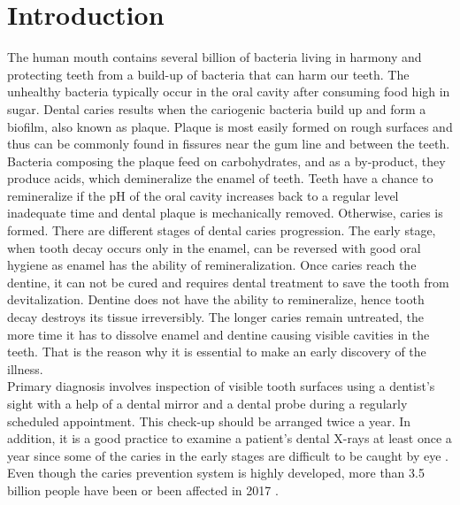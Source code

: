 \chapter{Introduction}
The human mouth contains several billion of bacteria living in harmony and protecting teeth from a build-up of bacteria that can harm our teeth. The unhealthy bacteria typically occur in the oral cavity after consuming food high in sugar. Dental caries results when the cariogenic bacteria build up and form a biofilm, also known as plaque. Plaque is most easily formed on rough surfaces and thus can be commonly found in fissures near the gum line and between the teeth. Bacteria composing the plaque feed on carbohydrates, and as a by-product, they produce acids, which demineralize the enamel of teeth. Teeth have a chance to remineralize if the pH of the oral cavity increases back to a regular level inadequate time and dental plaque is mechanically removed. Otherwise, caries is formed. There are different stages of dental caries progression. The early stage, when tooth decay occurs only in the enamel, can be reversed with good oral hygiene as enamel has the ability of remineralization. Once caries reach the dentine, it can not be cured and requires dental treatment to save the tooth from devitalization. Dentine does not have the ability to remineralize, hence tooth decay destroys its tissue irreversibly. The longer caries remain untreated, the more time it has to dissolve enamel and dentine causing visible cavities in the teeth. That is the reason why it is essential to make an early discovery of the illness. \\
Primary diagnosis involves inspection of visible tooth surfaces using a dentist's sight with a help of a dental mirror and a dental probe during a regularly scheduled appointment. This check-up should be arranged twice a year. In addition, it is a good practice to examine a patient's dental X-rays at least once a year since some of the caries in the early stages are difficult to be caught by eye \cite{cavityarticle}. \\
Even though the caries prevention system is highly developed, more than 3.5 billion people have been or been affected in 2017 \cite{James2018}.


